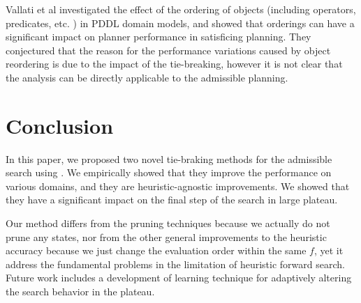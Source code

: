 Vallati et al  investigated the effect
of the ordering of objects (including operators, predicates, etc. ) in
PDDL domain models, and showed that orderings can have a significant
impact on planner performance in satisficing planning.
They conjectured that the reason for the performance variations caused
by object reordering is due to the impact of the tie-breaking,
however it is not clear that the analysis can be
directly applicable to the admissible planning.



\section{Conclusion}

In this paper, we proposed two novel tie-braking methods for the admissible search using \astar. We empirically showed that they improve the performance on various domains, and they are heuristic-agnostic improvements. We showed that they have a significant impact on the final step of the search in large plateau.

Our method differs from the pruning techniques because we actually
do not prune any states, nor from the other general improvements to the
heuristic accuracy because we just change the evaluation order within the
same $f$, yet it address the fundamental problems in the limitation of
heuristic forward search.  Future work includes a development of learning
technique for adaptively altering the search behavior in the plateau.



